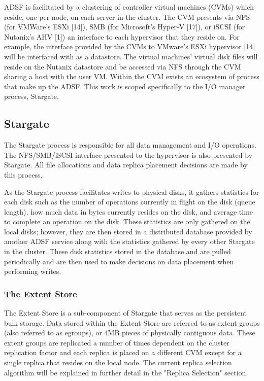 \documentclass[12pt]{article}
\begin{document}
  ADSF is facilitated by a clustering of controller virtual machines (CVMs)
  which reside, one per node, on each server in the cluster. The CVM presents
  via NFS (for VMWare's ESXi [14]), SMB (for Microsoft's Hyper-V [17]), or
  iSCSI (for Nutanix's AHV [1]) an interface to each hypervisor that they
  reside on. For example, the interface provided by the CVMs to VMware's ESXi
  hypervisor [14] will be interfaced with as a datastore. The virtual machines'
  virtual disk files will reside on the Nutanix datastore and be accessed via
  NFS through the CVM sharing a host with the user VM. Within the CVM exists an
  ecosystem of process that make up the ADSF. This work is scoped specifically
  to the I/O manager process, Stargate.


  \subsection{Stargate}

  The Stargate process is responsible for all data management and I/O
  operations. The NFS/SMB/iSCSI interface presented to the hypervisor is also
  presented by Stargate. All file allocations and data replica placement
  decisions are made by this process.

  As the Stargate process facilitates writes to physical disks, it gathers
  statistics for each disk such as the number of operations currently in flight
  on the disk (queue length), how much data in bytes currently resides on the
  disk, and average time to complete an operation on the disk. These statistics
  are only gathered on the local disks; however, they are then stored in a
  distributed database provided by another ADSF service along with the
  statistics gathered by every other Stargate in the cluster. These disk
  statistics stored in the database and are pulled periodically and are then
  used to make decisions on data placement when performing writes.

    \subsubsection{The Extent Store}

    The Extent Store is a sub-component of Stargate that serves as the
    persistent bulk storage. Data stored within the Extent Store are referred
    to as extent groups (also referred to as egroups), or 4MB pieces of
    physically contiguous data. These extent groups are replicated a number of
    times dependent on the cluster replication factor and each replica is
    placed on a different CVM except for a single replica that resides on the
    local node. The current replica selection algorithm will be explained in
    further detail in the "Replica Selection" section.
\end{document}

